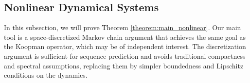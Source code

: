 \documentclass[11pt]{article}
\numberwithin{equation}{section}
\begin{document}
\subsection{Nonlinear Dynamical Systems}\label{sec:koopman-discrete}



In this subsection, we will prove Theorem \ref{theorem:main_nonlinear}. Our main tool is a space-discretized Markov chain argument that achieves the same goal as the Koopman operator, which may be of independent interest. The discretization argument is sufficient for sequence prediction and avoids traditional compactness and spectral assumptions, replacing them by simpler boundedness and Lipschitz conditions on the dynamics.  
\end{document}
